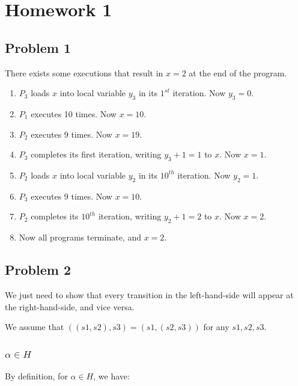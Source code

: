 \chapter{Homework 1}

\section{Problem 1}

There exists some executions that result in $x = 2$ at the end of the program.

\begin{enumerate}
    \item $P_3$ loads $x$ into local variable $y_3$ in its $1^{st}$ iteration.
        Now $y_3 = 0$.
    \item $P_1$ executes 10 times.
        Now $x = 10$.
    \item $P_2$ executes 9 times.
        Now $x = 19$.
    \item $P_3$ completes its first iteration, writing $y_3 + 1 = 1$ to $x$.
        Now $x = 1$.
    \item $P_2$ loads $x$ into local variable $y_2$ in its $10^{th}$ iteration.
        Now $y_2 = 1$.
    \item $P_3$ executes 9 times.
        Now $x = 10$.
    \item $P_2$ completes its $10^{th}$ iteration, writing $y_2 + 1 = 2$ to $x$.
        Now $x = 2$.
    \item Now all programs terminate, and $x = 2$.
\end{enumerate}

\section{Problem 2}

We just need to show that every transition in the left-hand-side will appear at the right-hand-side,
and vice versa.

We assume that $((s1, s2), s3) = (s1, (s2, s3))$ for any $s1, s2, s3$.

\subsection{$\alpha \in H$}

By definition, for $\alpha \in H$, we have:

\newcommand{\tripleTrans}[6] {
    \frac {
        #1 \xrightarrow{\alpha} #2, #3 \xrightarrow{\alpha} #4, #5 \xrightarrow{\alpha} #6
    } {
        (#1, #3, #5) \xrightarrow{\alpha} (#2, #4, #6)
    }
}

